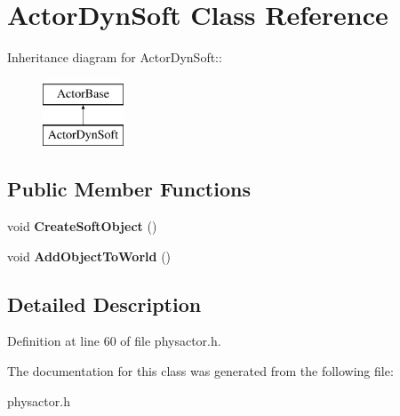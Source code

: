\hypertarget{classActorDynSoft}{
\section{ActorDynSoft Class Reference}
\label{dc/de0/classActorDynSoft}
}
Inheritance diagram for ActorDynSoft::\begin{figure}[H]
\begin{center}
\leavevmode
\includegraphics[height=2cm]{dc/de0/classActorDynSoft}
\end{center}
\end{figure}
\subsection*{Public Member Functions}
\begin{DoxyCompactItemize}
\item 
\hypertarget{classActorDynSoft_a249bc0621b1d55ea0a9c7787605078d6}{
void {\bfseries CreateSoftObject} ()}
\label{dc/de0/classActorDynSoft_a249bc0621b1d55ea0a9c7787605078d6}

\item 
\hypertarget{classActorDynSoft_ac44b23c6a024656196a523732887164e}{
void {\bfseries AddObjectToWorld} ()}
\label{dc/de0/classActorDynSoft_ac44b23c6a024656196a523732887164e}

\end{DoxyCompactItemize}


\subsection{Detailed Description}


Definition at line 60 of file physactor.h.

The documentation for this class was generated from the following file:\begin{DoxyCompactItemize}
\item 
physactor.h\end{DoxyCompactItemize}
